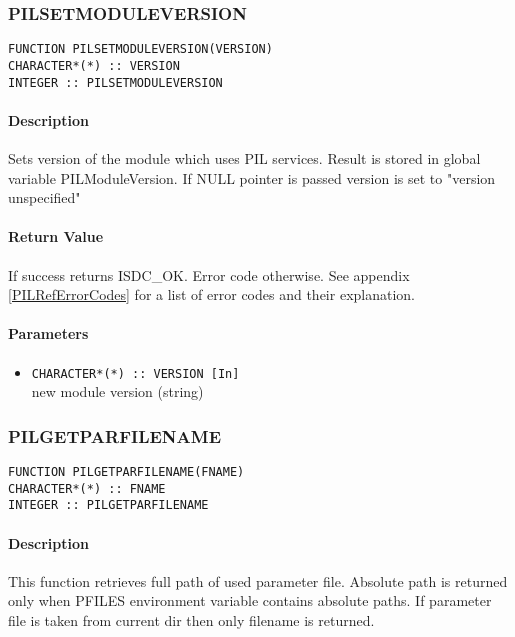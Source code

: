 
\subsubsection{PILSETMODULEVERSION}

\begin{verbatim}
FUNCTION PILSETMODULEVERSION(VERSION) 
CHARACTER*(*) :: VERSION 
INTEGER :: PILSETMODULEVERSION 
\end{verbatim}

\paragraph{Description\\}
Sets version of the module which uses PIL services. Result is stored in
global variable PILModuleVersion. If
NULL pointer is passed version is set to "version unspecified"

\paragraph{Return Value\\}
If success returns ISDC\_OK. Error code otherwise. See appendix \ref{PILRefErrorCodes}
for a list of error codes and their explanation.

\paragraph{Parameters}
\begin{itemize}
\item
{\tt CHARACTER*(*) :: VERSION [In] } \\
new module version (string)
\end{itemize}



\subsubsection{PILGETPARFILENAME}

\begin{verbatim}
FUNCTION PILGETPARFILENAME(FNAME) 
CHARACTER*(*) :: FNAME 
INTEGER :: PILGETPARFILENAME 
\end{verbatim}

\paragraph{Description\\}
This function retrieves full path of used parameter file. Absolute path is
returned only when PFILES
environment variable contains absolute paths. If parameter file is taken
from current dir then only filename is
returned. 

